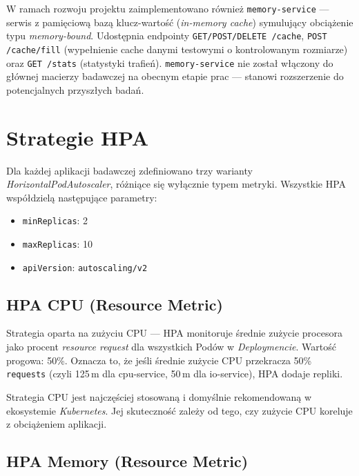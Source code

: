 W ramach rozwoju projektu zaimplementowano również \texttt{memory-service} — serwis z pamięciową bazą klucz-wartość (\textit{in-memory cache}) symulujący obciążenie typu \textit{memory-bound}. Udostępnia endpointy \texttt{GET/POST/DELETE /cache}, \texttt{POST /cache/fill} (wypełnienie cache danymi testowymi o kontrolowanym rozmiarze) oraz \texttt{GET /stats} (statystyki trafień). \texttt{memory-service} nie został włączony do głównej macierzy badawczej na obecnym etapie prac — stanowi rozszerzenie do potencjalnych przyszłych badań.

\section{Strategie HPA}

Dla każdej aplikacji badawczej zdefiniowano trzy warianty \textit{HorizontalPodAutoscaler}, różniące się wyłącznie typem metryki. Wszystkie HPA współdzielą następujące parametry:

\begin{itemize}
  \item \texttt{minReplicas}: 2
  \item \texttt{maxReplicas}: 10
  \item \texttt{apiVersion}: \texttt{autoscaling/v2}
\end{itemize}

\subsection{HPA CPU (Resource Metric)}

Strategia oparta na zużyciu CPU — HPA monitoruje średnie zużycie procesora jako procent \textit{resource request} dla wszystkich Podów w \textit{Deploymencie}. Wartość progowa: 50\%. Oznacza to, że jeśli średnie zużycie CPU przekracza 50\% \texttt{requests} (czyli 125\,m dla cpu-service, 50\,m dla io-service), HPA dodaje repliki.



Strategia CPU jest najczęściej stosowaną i domyślnie rekomendowaną w ekosystemie \textit{Kubernetes}. Jej skuteczność zależy od tego, czy zużycie CPU koreluje z obciążeniem aplikacji.

\subsection{HPA Memory (Resource Metric)}

